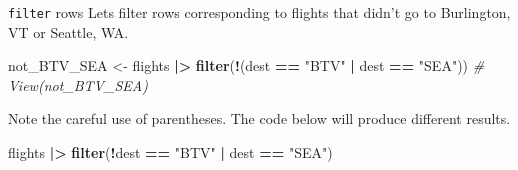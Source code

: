 \documentclass[
  ignorenonframetext,
]{beamer}
\newenvironment{Shaded}{\begin{snugshade}}{\end{snugshade}}
\newcommand{\CommentTok}[1]{\textcolor[rgb]{0.56,0.35,0.01}{\textit{#1}}}
\newcommand{\FunctionTok}[1]{\textcolor[rgb]{0.13,0.29,0.53}{\textbf{#1}}}
\newcommand{\NormalTok}[1]{#1}
\newcommand{\OtherTok}[1]{\textcolor[rgb]{0.56,0.35,0.01}{#1}}
\newcommand{\SpecialCharTok}[1]{\textcolor[rgb]{0.81,0.36,0.00}{\textbf{#1}}}
\newcommand{\StringTok}[1]{\textcolor[rgb]{0.31,0.60,0.02}{#1}}
\begin{document}
\begin{frame}[fragile]{\texttt{filter} rows}
\protect\hypertarget{filter-rows-4}{}
Lets filter rows corresponding to flights that didn't go to Burlington,
VT or Seattle, WA.

\normalsize

\begin{Shaded}
\begin{Highlighting}[]
\NormalTok{not\_BTV\_SEA }\OtherTok{\textless{}{-}}\NormalTok{ flights }\SpecialCharTok{|\textgreater{}} 
  \FunctionTok{filter}\NormalTok{(}\SpecialCharTok{!}\NormalTok{(dest }\SpecialCharTok{==} \StringTok{"BTV"} \SpecialCharTok{|}\NormalTok{ dest }\SpecialCharTok{==} \StringTok{"SEA"}\NormalTok{))}
\CommentTok{\# View(not\_BTV\_SEA)}
\end{Highlighting}
\end{Shaded}

\normalsize

Note the careful use of parentheses. The code below will produce
different results. \normalsize

\begin{Shaded}
\begin{Highlighting}[]
\NormalTok{flights }\SpecialCharTok{|\textgreater{}} 
  \FunctionTok{filter}\NormalTok{(}\SpecialCharTok{!}\NormalTok{dest }\SpecialCharTok{==} \StringTok{"BTV"} \SpecialCharTok{|}\NormalTok{ dest }\SpecialCharTok{==} \StringTok{"SEA"}\NormalTok{)}
\end{Highlighting}
\end{Shaded}

\normalsize
\end{frame}
\end{document}
